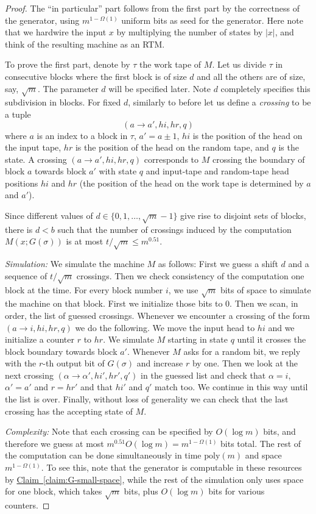 \documentclass[11pt]{article}
\numberwithin{equation}{section}
\theoremstyle{definition}
\theoremstyle{plain}
\newcommand{\expref}[2]{\hyperref[#2]{#1~\ref{#2}}}
\newcommand{\poly}{\mathrm{poly}}
\begin{document}
\begin{proof}
The ``in particular'' part follows from the first part by the correctness
of the generator, using $m^{1-\Omega(1)}$ uniform bits as seed for
the generator. Here note that we hardwire the input $x$ by multiplying
the number of states by $|x|$, and think of the resulting machine
as an RTM.

To prove the first part, denote by $\tau$ the work tape of $M$.
Let us divide $\tau$ in consecutive blocks where the first block
is of size $d$ and all the others are of size, say, $\sqrt{m}$.
The parameter $d$ will be specified later. Note $d$ completely specifies
this subdivision in blocks. For fixed $d$, similarly to before let
us define a \emph{crossing} to be a tuple 
\[
(a\rightarrow a',hi,hr,q)
\]
where $a$ is an index to a block in $\tau$, $a'=a\pm1$, $hi$ is
the position of the head on the input tape, $hr$ is the position
of the head on the random tape, and $q$ is the state. A crossing
$(a\rightarrow a',hi,hr,q)$ corresponds to $M$ crossing the boundary
of block $a$ towards block $a'$ with state $q$ and input-tape and
random-tape head positions $hi$ and $hr$ (the position of the head
on the work tape is determined by $a$ and $a'$).

Since different values of $d\in\{0,1,\ldots,\sqrt{m}-1\}$ give rise
to disjoint sets of blocks, there is $d<b$ such that the number of
crossings induced by the computation $M(x;G(\sigma))$ is at most
$t/\sqrt{m}\leq m^{0.51}$.

\emph{Simulation:} We simulate the machine $M$ as follows: First
we guess a shift $d$ and a sequence of $t/\sqrt{m}$ crossings. Then
we check consistency of the computation one block at the time. For
every block number $i$, we use $\sqrt{m}$ bits of space to simulate
the machine on that block. First we initialize those bits to $0$.
Then we scan, in order, the list of guessed crossings. Whenever we
encounter a crossing of the form $(a\rightarrow i,hi,hr,q)$ we do
the following. We move the input head to $hi$ and we initialize a
counter $r$ to $hr$. We simulate $M$ starting in state $q$ until
it crosses the block boundary towards block $a'$. Whenever $M$ asks
for a random bit, we reply with the $r$-th output bit of $G(\sigma)$
and increase $r$ by one. Then we look at the next crossing $(\alpha\rightarrow\alpha',hi',hr',q')$
in the guessed list and check that $\alpha=i$, $\alpha'=a'$ and
$r=hr'$ and that $hi'$ and $q'$ match too. We continue in this
way until the list is over. Finally, without loss of generality we
can check that the last crossing has the accepting state of $M$.

\emph{Complexity:} Note that each crossing can be specified by $O(\log m)$
bits, and therefore we guess at most $m^{0.51}O(\log m)=m^{1-\Omega(1)}$
bits total. The rest of the computation can be done simultaneously
in time $\poly(m)$ and space $m^{1-\Omega(1)}$. To see this, note
that the generator is computable in these resources by \expref{Claim}{claim:G-small-space},
while the rest of the simulation only uses space for one block, which
takes $\sqrt{m}$ bits, plus $O(\log m)$ bits for various counters.
\end{proof}
\end{document}

